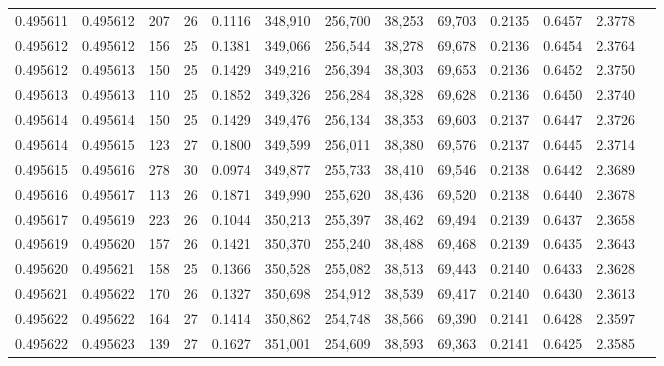 \begin{tabular}{rrrrrrrrrrrrr}
0.495611 & 0.495612 & 207 &  26 &                                     0.1116 & 348,910 & 256,700 &  38,253 &  69,703 & 0.2135 & 0.6457 & 2.3778 \\
0.495612 & 0.495612 & 156 &  25 &                                     0.1381 & 349,066 & 256,544 &  38,278 &  69,678 & 0.2136 & 0.6454 & 2.3764 \\
0.495612 & 0.495613 & 150 &  25 &                                     0.1429 & 349,216 & 256,394 &  38,303 &  69,653 & 0.2136 & 0.6452 & 2.3750 \\
0.495613 & 0.495613 & 110 &  25 &                                     0.1852 & 349,326 & 256,284 &  38,328 &  69,628 & 0.2136 & 0.6450 & 2.3740 \\
0.495614 & 0.495614 & 150 &  25 &                                     0.1429 & 349,476 & 256,134 &  38,353 &  69,603 & 0.2137 & 0.6447 & 2.3726 \\
0.495614 & 0.495615 & 123 &  27 &                                     0.1800 & 349,599 & 256,011 &  38,380 &  69,576 & 0.2137 & 0.6445 & 2.3714 \\
0.495615 & 0.495616 & 278 &  30 &                                     0.0974 & 349,877 & 255,733 &  38,410 &  69,546 & 0.2138 & 0.6442 & 2.3689 \\
0.495616 & 0.495617 & 113 &  26 &                                     0.1871 & 349,990 & 255,620 &  38,436 &  69,520 & 0.2138 & 0.6440 & 2.3678 \\
0.495617 & 0.495619 & 223 &  26 &                                     0.1044 & 350,213 & 255,397 &  38,462 &  69,494 & 0.2139 & 0.6437 & 2.3658 \\
0.495619 & 0.495620 & 157 &  26 &                                     0.1421 & 350,370 & 255,240 &  38,488 &  69,468 & 0.2139 & 0.6435 & 2.3643 \\
0.495620 & 0.495621 & 158 &  25 &                                     0.1366 & 350,528 & 255,082 &  38,513 &  69,443 & 0.2140 & 0.6433 & 2.3628 \\
0.495621 & 0.495622 & 170 &  26 &                                     0.1327 & 350,698 & 254,912 &  38,539 &  69,417 & 0.2140 & 0.6430 & 2.3613 \\
0.495622 & 0.495622 & 164 &  27 &                                     0.1414 & 350,862 & 254,748 &  38,566 &  69,390 & 0.2141 & 0.6428 & 2.3597 \\
0.495622 & 0.495623 & 139 &  27 &                                     0.1627 & 351,001 & 254,609 &  38,593 &  69,363 & 0.2141 & 0.6425 & 2.3585 \\

\end{tabular}
